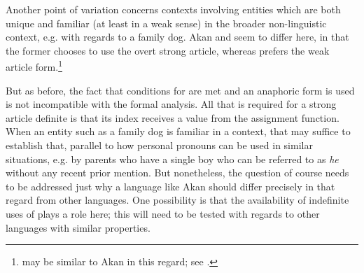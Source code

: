 \documentclass[output=paper
,modfonts
,nonflat]{langscibook}
\begin{document}
Another point of variation concerns contexts involving entities which
are both unique and familiar (at least in a weak sense) in the broader
non-linguistic context, e.g. with regards to a family dog. Akan and
 seem to differ here, in that the former chooses to use the
overt strong article, whereas  prefers the weak article form.\footnote{ may be similar to Akan in this regard; see \citet[189--190]{Wespel2008}.}



But as before, the fact that conditions for  are
met and an anaphoric
form is used is not
incompatible with the formal analysis. All that is required for a
strong article definite is that its index receives a value from the
assignment function. When an entity such as a family dog is familiar
in a context, that may suffice to establish that, parallel to how
personal pronouns can be used in similar situations, e.g. by parents
who have a single boy who can be referred to as \textit{he} without
any recent prior mention. But nonetheless, the question of course
needs to be addressed just why a language like Akan should differ
precisely in that regard from other languages. One possibility is that
the availability of indefinite uses of  plays a role
here; this will need to be tested with regards to other languages with
similar properties.
\end{document}
